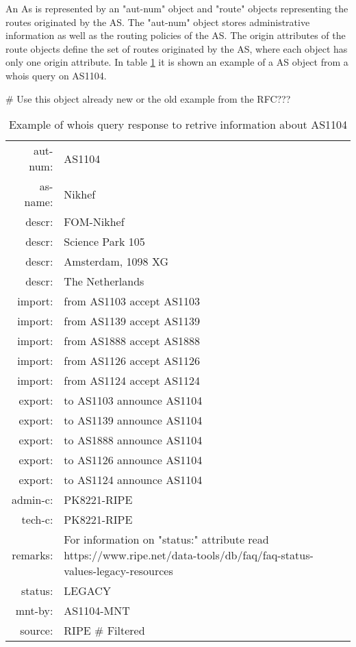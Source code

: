 \documentclass[11pt]{report}
\begin{document}
An As is represented by an "aut-num" object and "route" objects representing the routes originated by the AS. The "aut-num" object stores administrative information as well as the routing policies of the AS. The origin attributes of the route objects define the set of routes originated by the AS, where each object has only one origin attribute. In table \ref{table:4} it is shown an example of a AS object from a whois query on AS1104.  
    
\# Use this object already new or the old example from the RFC???

\begin{table}[h!]
\centering
\begin{tabular}{  r  l  }

aut-num:    &      	AS1104\\
as-name:    &      	Nikhef\\
descr:   	&     	FOM-Nikhef\\
descr:   	&    	Science Park 105\\
descr:		&   	Amsterdam, 1098 XG\\
descr:   	&	    The Netherlands\\
import:  	&       from AS1103 accept AS1103\\
import:  	&       from AS1139 accept AS1139\\
import:  	&       from AS1888 accept AS1888\\
import:  	&       from AS1126 accept AS1126\\
import:  	&       from AS1124 accept AS1124\\
export:  	&       to AS1103 announce AS1104\\
export:  	&       to AS1139 announce AS1104\\
export:  	&       to AS1888 announce AS1104\\
export:  	&       to AS1126 announce AS1104\\
export:  	&       to AS1124 announce AS1104\\
admin-c: 	&       PK8221-RIPE\\
tech-c:  	&       PK8221-RIPE\\
remarks: 	&       For information on "status:" attribute read https://www.ripe.net/data-tools/db/faq/faq-status-values-legacy-resources\\
status:  	&       LEGACY\\
mnt-by:  	&       AS1104-MNT\\
source:  	&       RIPE \# Filtered\\

\end{tabular}
\caption{Example of whois query response to retrive information about AS1104}
\label{table:4}
\end{table} 
\end{document}
